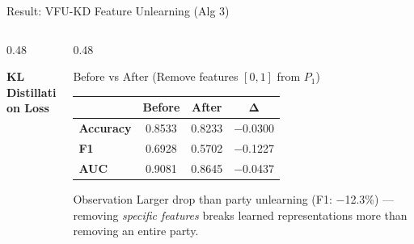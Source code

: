 \documentclass[aspectratio=169, 11pt]{beamer}
\begin{document}
\begin{frame}{Result: VFU-KD Feature Unlearning (Alg 3)}
  \begin{columns}[T]
    \begin{column}{0.48\textwidth}
      \begin{center}
        \textbf{KL Distillation Loss}\\[0.3cm]
      \end{center}
    \end{column}
    \begin{column}{0.48\textwidth}
      \begin{block}{Before vs After (Remove features $[0,1]$ from $P_1$)}
        \centering
        \renewcommand{\arraystretch}{1.3}
        \begin{tabular}{>{\bfseries\footnotesize}l >{\footnotesize}c >{\footnotesize}c >{\footnotesize}c}
          \toprule
          & \textbf{Before} & \textbf{After} & $\boldsymbol{\Delta}$ \\
          \midrule
          Accuracy & 0.8533 & 0.8233 & \textcolor{accentred}{$-$0.0300} \\
          F1       & 0.6928 & 0.5702 & \textcolor{accentred}{$-$0.1227} \\
          AUC      & 0.9081 & 0.8645 & \textcolor{accentred}{$-$0.0437} \\
          \bottomrule
        \end{tabular}
      \end{block}
      \vspace{0.3cm}
      \begin{alertblock}{Observation}
        \footnotesize
        Larger drop than party unlearning (F1: $-$12.3\%) --- removing \emph{specific features} breaks learned representations more than removing an entire party.
      \end{alertblock}
    \end{column}
  \end{columns}
\end{frame}
\end{document}

